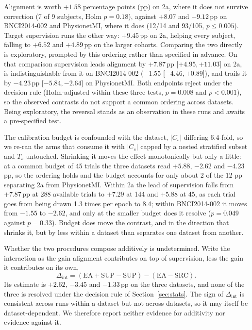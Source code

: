 Alignment is worth $+1.58$ percentage points (pp) on 2a, where it does not survive correction (7 of 9 subjects, Holm $p=0.18$), against $+8.07$ and $+9.12$\,pp on BNCI2014-002 and PhysionetMI, where it does (12/14 and 93/105, $p\le0.005$). Target supervision runs the other way: $+9.45$\,pp on 2a, helping every subject, falling to $+6.52$ and $+4.89$\,pp on the larger cohorts. Comparing the two directly is exploratory, prompted by this ordering rather than specified in advance. On that comparison supervision leads alignment by $+7.87$\,pp [$+4.95, +11.03$] on 2a, is indistinguishable from it on BNCI2014-002 ($-1.55$ [$-4.46, +0.89$]), and trails it by $-4.23$\,pp [$-5.84, -2.64$] on PhysionetMI. Both endpoints reject under the decision rule (Holm-adjusted within these three tests, $p=0.008$ and $p<0.001$), so the observed contrasts do not support a common ordering across datasets. Being exploratory, the reversal stands as an observation in these runs and awaits a pre-specified test.

The calibration budget is confounded with the dataset, $|C_s|$ differing 6.4-fold, so we re-ran the arms that consume it with $|C_s|$ capped by a nested stratified subset and $T_s$ untouched. Shrinking it moves the effect monotonically but only a little: at a common budget of 45 trials the three datasets read $+5.88$, $-2.62$ and $-4.23$\,pp, so the ordering holds and the budget accounts for only about 2 of the 12 pp separating 2a from PhysionetMI. Within 2a the lead of supervision falls from $+7.87$\,pp at 288 available trials to $+7.29$ at 144 and $+5.88$ at 45, as each trial goes from being drawn 1.3 times per epoch to 8.4; within BNCI2014-002 it moves from $-1.55$ to $-2.62$, and only at the smaller budget does it resolve ($p=0.049$ against $p=0.33$). Budget does move the contrast, and in the direction that shrinks it, but by less within a dataset than separates one dataset from another.

Whether the two procedures compose additively is undetermined. Write the interaction as the gain alignment contributes on top of supervision, less the gain it contributes on its own,
\begin{equation}
\label{eq:interaction}
\Delta_{\mathrm{int}} = (\mathrm{EA{+}SUP} - \mathrm{SUP}) - (\mathrm{EA} - \mathrm{SRC}).
\end{equation}
Its estimate is $+2.62$, $-3.45$ and $-1.33$\,pp on the three datasets, and none of the three is resolved under the decision rule of Section~\ref{sec:stats}. The sign of $\Delta_{\mathrm{int}}$ is consistent across runs within a dataset but not across datasets, so it may itself be dataset-dependent. We therefore report neither evidence for additivity nor evidence against it.

